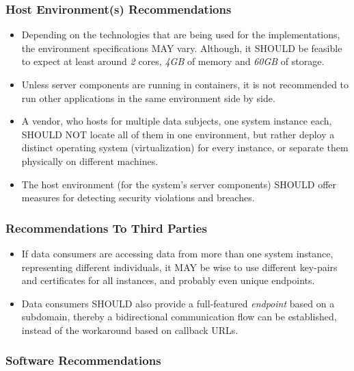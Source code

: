 \documentclass[12pt,english,a4paper,titlepage,cleardoublepage=empty,dottedtoc]{report}
\begin{document}
\subsubsection*{Host Environment(s)
Recommendations}\label{host-environments-recommendations}

\begin{itemize}
\item
  Depending on the technologies that are being used for the
  implementations, the environment specifications MAY vary. Although, it
  SHOULD be feasible to expect at least around \emph{2} cores,
  \emph{4GB} of memory and \emph{60GB} of storage.
\item
  Unless server components are running in containers, it is not
  recommended to run other applications in the same environment side by
  side.
\item
  A vendor, who hosts for multiple data subjects, one system instance
  each, SHOULD NOT locate all of them in one environment, but rather
  deploy a distinct operating system (virtualization) for every
  instance, or separate them physically on different machines.
\item
  The host environment (for the system's server components) SHOULD offer
  measures for detecting security violations and breaches.
\end{itemize}

\subsubsection*{Recommendations To Third
Parties}\label{recommendations-to-third-parties}

\begin{itemize}
\item
  If data consumers are accessing data from more than one system
  instance, representing different individuals, it MAY be wise to use
  different key-pairs and certificates for all instances, and probably
  even unique endpoints.
\item
  Data consumers SHOULD also provide a full-featured \emph{endpoint}
  based on a subdomain, thereby a bidirectional communication flow can
  be established, instead of the workaround based on callback URLs.
\end{itemize}

\subsubsection*{Software
Recommendations}\label{software-recommendations}
\end{document}
